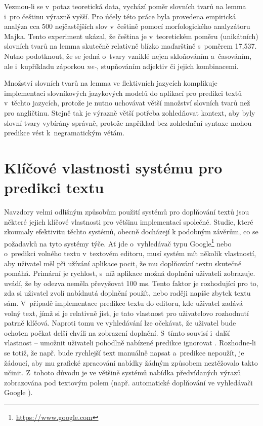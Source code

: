 \documentclass[a4paper,11pt,openany]{book} %
\begin{document}
Vezmou-li se v~potaz teoretická data, vychází poměr slovních tvarů na lemma i~pro češtinu výrazně vyšší. Pro účely této práce byla provedena empirická analýza cca 500 nejčastějších slov v~češtině pomocí morfologického analyzátoru Majka. Tento experiment ukázal, že čeština je v~teoretickém poměru (unikátních) slovních tvarů na lemma skutečně relativně blízko maďarštině s~poměrem 17,537. Nutno podotknout, že se jedná o~tvary vzniklé nejen skloňováním a~časováním, ale i~kupříkladu záporkou {\it ne-}, stupňováním adjektiv či jejich kombinacemi.


Množství slovních tvarů na lemma ve flektivních jazycích komplikuje implementaci slovníkových jazykových modelů do aplikací pro predikci textů v~těchto jazycích, protože je nutno uchovávat větší množství slovních tvarů než pro angličtinu. Stejně tak je výrazně větší potřeba zohledňovat kontext, aby byly slovní tvary vybírány správně, protože například bez zohlednění syntaxe mohou predikce vést k~negramatickým větám. \parencite[5234--5235]{ghayoomi2009overview}

\chapter{Klíčové vlastnosti systému pro predikci textu}

Navzdory velmi odlišným způsobům použití systémů pro doplňování textů jsou některé jejich klíčové vlastnosti pro většinu implementací společné. Studie, které zkoumaly efektivitu těchto systémů, obecně docházejí k podobným závěrům, co se požadavků na tyto systémy týče. Ať jde o~vyhledávač typu Google\footnote{\url{https://www.google.com}} nebo o~predikci volného textu v~textovém editoru, musí systém mít několik vlastností, aby uživatel měl při užívání aplikace pocit, že mu doplňování textu skutečně pomáhá.  Primární je rychlost, s~níž aplikace možná doplnění uživateli zobrazuje. \parencite{nandi2007assisted} uvádí, že by odezva neměla převyšovat 100 ms. Tento faktor je rozhodující pro to, zda si uživatel zvolí nabídnutá doplnění použít, nebo raději napíše zbytek textu sám. V~případě implementace predikce textu do editoru, kde uživatel zadává volný text, jímž si je relativně jist, je tato vlastnost pro uživatelovo rozhodnutí patrně klíčová. Naproti tomu ve vyhledávání lze očekávat, že uživatel bude ochoten počkat delší chvíli na zobrazení doplnění. S~tímto souvisí i~další vlastnost -- umožnit uživateli pohodlně nabízené predikce ignorovat \parencite{ward2012autocomplete}. Rozhodne-li se totiž, že např. bude rychlejší text manuálně napsat a~predikce nepoužít, je žádoucí, aby mu grafické zpracování nabídky žádným způsobem neztěžovalo takto učinit. Z~tohoto důvodu je ve většině systémů nabídka předvídaných výrazů zobrazována pod textovým polem (např. automatické doplňování ve vyhledávači Google \parencite{google2015}). 
\end{document}

